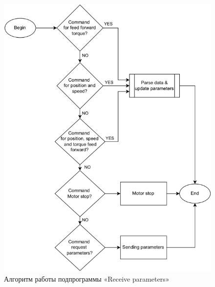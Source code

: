 \begin{figure}[H]
	\centering
	\includegraphics[width=\textwidth]{Src/images/Receive parameters.png}
	\caption{Алгоритм работы подпрограммы «Receive parameters»}
	\label{AlgRecive}
\end{figure}
